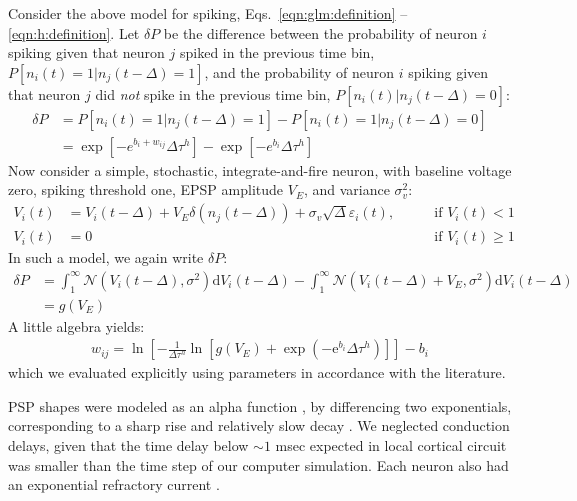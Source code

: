 Consider the above model for spiking, Eqs.~\eqref{eqn:glm:definition} -- \eqref{eqn:h:definition}.  Let $\delta P$ be the difference between the probability of neuron $i$ spiking given that neuron $j$ spiked in the previous time bin, $P[n_i(t)=1 | n_j(t-\Delta)=1]$, and the probability of neuron $i$ spiking given that neuron $j$ did \emph{not} spike in the previous time bin, $P[n_i(t) | n_j(t-\Delta)=0]$:
\begin{align}\label{eqn:convert:leadin-2}
\delta P &= P[n_i(t)=1 | n_j(t-\Delta)=1] - P[n_i(t)=1 | n_j(t-\Delta)=0] \nonumber
\\ &= \exp[-e^{b_i+w_{ij}}\Delta\tau^h]-\exp[-e^{b_i}\Delta\tau^h]
\end{align}
Now consider a simple, stochastic, integrate-and-fire neuron, with baseline voltage zero, spiking threshold one, EPSP amplitude $V_E$, and variance $\sigma_v^2$:
\begin{align}
	V_i(t) &= V_i(t-\Delta) + V_E \delta(n_j(t-\Delta)) + \sigma_v \sqrt{\Delta} \varepsilon_i(t), \qquad &\text{if } V_i(t)<1 \nonumber
\\	V_i(t) &= 0 &\text{if } V_i(t)\geq 1 
\end{align}
In such a model, we again write $\delta P$:
\begin{align}\label{eqn:convert:leadin-3}
\delta P &= \int_1^\infty \mathcal{N}(V_i(t-\Delta),\sigma^2) \text{d}V_i(t-\Delta) - \int_1^\infty \mathcal{N}(V_i(t-\Delta)+V_E,\sigma^2)\text{d}V_i(t-\Delta) \nonumber
\\ &=g(V_E)
\end{align}
A little algebra yields:
\begin{align}
	w_{ij}= \ln \left[ -\frac{1}{\Delta \tau^h} \ln \left[g(V_E)+ \exp\left(-\text{e}^{b_i}\Delta\tau^h\right)\right]\right]-b_i
\end{align}
which we evaluated explicitly using parameters in accordance with the literature.

PSP shapes were modeled as an alpha function \cite{Koch99}, by differencing two exponentials, corresponding to a sharp rise and relatively slow decay \cite{Sayer1990}. We neglected conduction delays, given that the time delay below $\sim 1$ msec expected in local cortical circuit was smaller than the time step of our computer simulation. Each neuron also had an exponential refractory current \cite{Koch99}.

